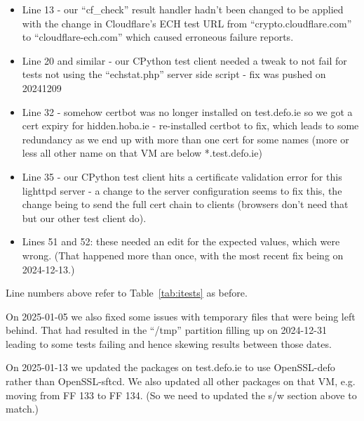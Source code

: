 \begin{itemize}
    \item Line 13 - our ``cf\_check'' result handler hadn't been changed to be
        applied with the change in Cloudflare's ECH test URL from
        ``crypto.cloudflare.com'' to ``cloudflare-ech.com'' which caused
        erroneous failure reports.

    \item Line 20 and similar - our CPython test client needed a tweak to not
        fail for tests not using the ``echstat.php'' server side script - fix
        was pushed on 20241209

    \item Line 32 - somehow certbot was no longer installed on test.defo.ie so
        we got a cert expiry for hidden.hoba.ie - re-installed certbot to fix,
        which leads to some redundancy as we end up with more than one cert for
        some names (more or less all other name on that VM are below
        *.test.defo.ie)

    \item Line 35 - our CPython test client hits a certificate validation error
        for this lighttpd server - a change to the server configuration seems
        to fix this, the change being to send the full cert chain to clients
        (browsers don't need that but our other test client do).

    \item Lines 51 and 52: these needed an edit for the expected values, which were
        wrong. (That happened more than once, with the most recent fix being
        on 2024-12-13.)

\end{itemize}

Line numbers above refer to Table~\ref{tab:itests} as before.

On 2025-01-05 we also fixed some issues with temporary files that were being
left behind. That had resulted in the ``/tmp'' partition filling up on 2024-12-31
leading to some tests failing and hence skewing results between those dates.

On 2025-01-13 we updated the packages on test.defo.ie to use OpenSSL-defo rather
than OpenSSL-sftcd. We also updated all other packages on that VM, e.g. moving
from FF 133 to FF 134. (So we need to updated the s/w section above to match.)
